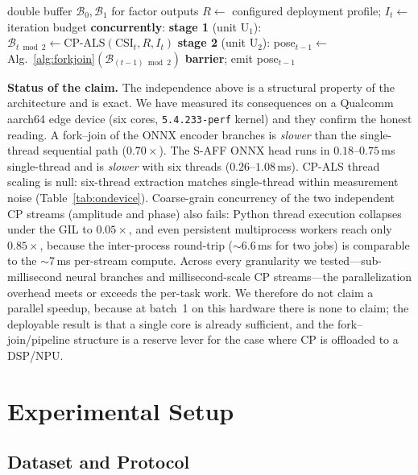 \documentclass[10pt,conference]{IEEEtran}
\begin{document}
\begin{algorithm}[t]
\caption{Pipelined streaming with fixed rank profile}
\label{alg:pipeline}
\begin{algorithmic}[1]
\State double buffer $\mathcal{B}_0,\mathcal{B}_1$ for factor outputs
  \State $R \gets$ configured deployment profile; $I_t \gets$ iteration budget
  \State \textbf{concurrently}:
  \State \quad \textbf{stage 1} (unit U$_1$): $\mathcal{B}_{t\bmod2} \gets \mathrm{CP\text{-}ALS}(\text{CSI}_t, R, I_t)$
  \State \quad \textbf{stage 2} (unit U$_2$): pose$_{t-1} \gets$ Alg.~\ref{alg:forkjoin}$(\mathcal{B}_{(t-1)\bmod2})$
  \State \textbf{barrier}; emit pose$_{t-1}$
\EndFor
\end{algorithmic}
\end{algorithm}

\textbf{Status of the claim.}
The independence above is a structural property of the architecture and is exact. We have measured its consequences on a Qualcomm aarch64 edge device (six cores, \texttt{5.4.233-perf} kernel) and they confirm the honest reading. A fork--join of the ONNX encoder branches is \emph{slower} than the single-thread sequential path ($0.70\times$). The S-AFF ONNX head runs in $0.18$--$0.75$\,ms single-thread and is \emph{slower} with six threads ($0.26$--$1.08$\,ms). CP-ALS thread scaling is null: six-thread extraction matches single-thread within measurement noise (Table~\ref{tab:ondevice}). Coarse-grain concurrency of the two independent CP streams (amplitude and phase) also fails: Python thread execution collapses under the GIL to $0.05\times$, and even persistent multiprocess workers reach only $0.85\times$, because the inter-process round-trip ($\sim$6.6\,ms for two jobs) is comparable to the $\sim$7\,ms per-stream compute. Across every granularity we tested---sub-millisecond neural branches and millisecond-scale CP streams---the parallelization overhead meets or exceeds the per-task work. We therefore do not claim a parallel speedup, because at batch~1 on this hardware there is none to claim; the deployable result is that a single core is already sufficient, and the fork--join/pipeline structure is a reserve lever for the case where CP is offloaded to a DSP/NPU.

\section{Experimental Setup}

\subsection{Dataset and Protocol}
\end{document}
